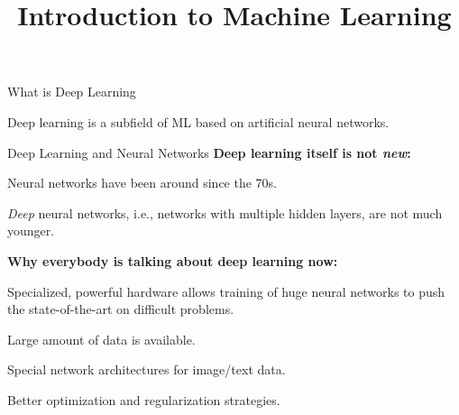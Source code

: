 \documentclass[11pt,compress,t,notes=noshow, xcolor=table]{beamer}
\title{Introduction to Machine Learning}
\begin{document}


\begin{framei}{What is Deep Learning}
\item Deep learning is a subfield of ML based on artificial neural networks.
\end{framei}


\begin{frame}{Deep Learning and Neural Networks}
\textbf{Deep learning itself is not \textit{new}:}
\begin{itemizeM}
\item Neural networks have been around since the 70s.
\item \textit{Deep} neural networks, i.e., networks with multiple hidden layers, are not much younger.
\end{itemizeM}
\textbf{Why everybody is talking about deep learning now:}
\begin{itemizeM}
\item Specialized, powerful hardware allows training of huge neural networks to push the state-of-the-art on difficult problems.
\item Large amount of data is available.
\item Special network architectures for image/text data.
\item Better optimization and regularization strategies.
\end{itemizeM}
\end{frame}
\end{document}
